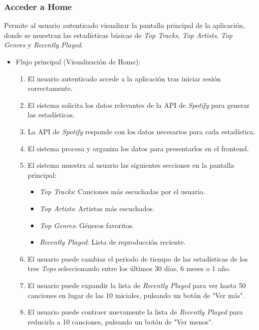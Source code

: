 \newpage

\subsubsection*{Acceder a Home}

Permite al usuario autenticado visualizar la pantalla principal de la aplicación, donde se muestran las estadísticas básicas de \textit{Top Tracks}, \textit{Top Artists}, \textit{Top Genres} y \textit{Recently Played}.

\begin{itemize}
    \item Flujo principal (Visualización de Home):
          \begin{enumerate}
              \item El usuario autenticado accede a la aplicación tras iniciar sesión correctamente.
              \item El sistema solicita los datos relevantes de la API de \textit{Spotify} para generar las estadísticas.
              \item La API de \textit{Spotify} responde con los datos necesarios para cada estadística.
              \item El sistema procesa y organiza los datos para presentarlos en el frontend.
              \item El sistema muestra al usuario las siguientes secciones en la pantalla principal:
                    \begin{itemize}
                        \item \textit{Top Tracks}: Canciones más escuchadas por el usuario.
                        \item \textit{Top Artists}: Artistas más escuchados.
                        \item \textit{Top Genres}: Géneros favoritos.
                        \item \textit{Recently Played}: Lista de reproducción reciente.
                    \end{itemize}
              \item El usuario puede cambiar el periodo de tiempo de las estadísticas de los tres \textit{Tops} seleccionando entre los últimos 30 días, 6 meses o 1 año.
              \item El usuario puede expandir la lista de \textit{Recently Played} para ver hasta 50 canciones en lugar de las 10 iniciales, pulsando un botón de "Ver más".
              \item El usuario puede contraer nuevamente la lista de \textit{Recently Played} para reducirla a 10 canciones, pulsando un botón de "Ver menos".

\end{enumerate}
\end{itemize}
